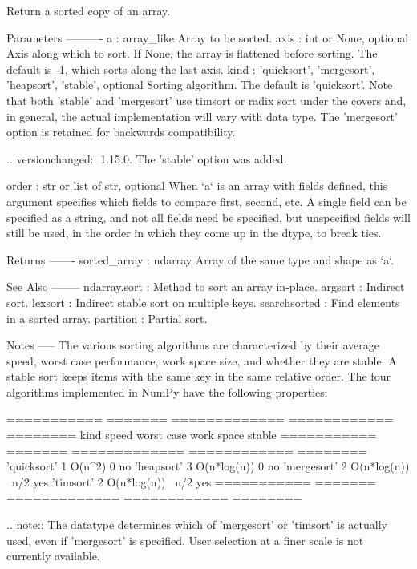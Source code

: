\begin{DoxyVerb}Return a sorted copy of an array.

Parameters
----------
a : array_like
    Array to be sorted.
axis : int or None, optional
    Axis along which to sort. If None, the array is flattened before
    sorting. The default is -1, which sorts along the last axis.
kind : {'quicksort', 'mergesort', 'heapsort', 'stable'}, optional
    Sorting algorithm. The default is 'quicksort'. Note that both 'stable'
    and 'mergesort' use timsort or radix sort under the covers and, in general,
    the actual implementation will vary with data type. The 'mergesort' option
    is retained for backwards compatibility.

    .. versionchanged:: 1.15.0.
       The 'stable' option was added.

order : str or list of str, optional
    When `a` is an array with fields defined, this argument specifies
    which fields to compare first, second, etc.  A single field can
    be specified as a string, and not all fields need be specified,
    but unspecified fields will still be used, in the order in which
    they come up in the dtype, to break ties.

Returns
-------
sorted_array : ndarray
    Array of the same type and shape as `a`.

See Also
--------
ndarray.sort : Method to sort an array in-place.
argsort : Indirect sort.
lexsort : Indirect stable sort on multiple keys.
searchsorted : Find elements in a sorted array.
partition : Partial sort.

Notes
-----
The various sorting algorithms are characterized by their average speed,
worst case performance, work space size, and whether they are stable. A
stable sort keeps items with the same key in the same relative
order. The four algorithms implemented in NumPy have the following
properties:

=========== ======= ============= ============ ========
   kind      speed   worst case    work space   stable
=========== ======= ============= ============ ========
'quicksort'    1     O(n^2)            0          no
'heapsort'     3     O(n*log(n))       0          no
'mergesort'    2     O(n*log(n))      ~n/2        yes
'timsort'      2     O(n*log(n))      ~n/2        yes
=========== ======= ============= ============ ========

.. note:: The datatype determines which of 'mergesort' or 'timsort'
   is actually used, even if 'mergesort' is specified. User selection
   at a finer scale is not currently available.


\end{DoxyVerb}
